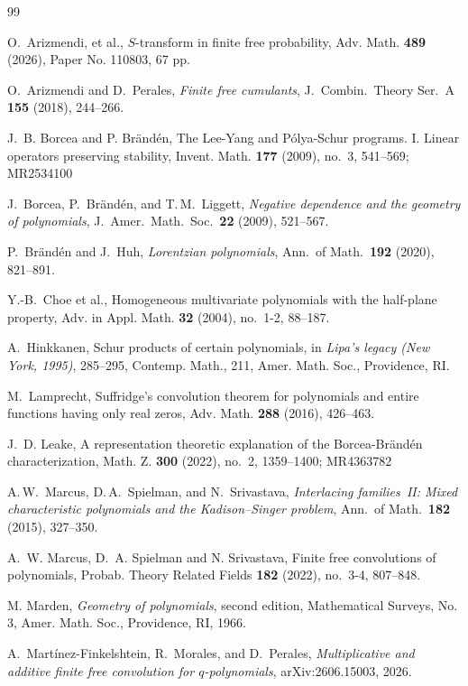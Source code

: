 \documentclass[11pt]{amsart}
\theoremstyle{definition}
\begin{document}
\begin{thebibliography}{99}

 O.~Arizmendi, et al., $S$-transform in finite free probability, Adv. Math. {\bf 489} (2026), Paper No. 110803, 67 pp.

O.~Arizmendi and D.~Perales,
\emph{Finite free cumulants},
J.~Combin.\ Theory Ser.~A \textbf{155} (2018), 244--266.

 J.~B. Borcea and P. Br\"and\'en, The Lee-Yang and P\'olya-Schur programs. I. Linear operators preserving stability, Invent. Math. {\bf 177} (2009), no.~3, 541--569; MR2534100

J.~Borcea, P.~Br\"and\'en, and T.\,M.~Liggett,
\emph{Negative dependence and the geometry of polynomials},
J.~Amer.\ Math.\ Soc.\ \textbf{22} (2009), 521--567.

P.~Br\"and\'en and J.~Huh,
\emph{Lorentzian polynomials},
Ann.\ of Math.\ \textbf{192} (2020), 821--891.

 Y.-B.~Choe et al., Homogeneous multivariate polynomials with the half-plane property, Adv. in Appl. Math. {\bf 32} (2004), no.~1-2, 88--187.

 A.~Hinkkanen, Schur products of certain polynomials, in {\it Lipa's legacy (New York, 1995)}, 285--295, Contemp. Math., 211, Amer. Math. Soc., Providence, RI.

M.~Lamprecht, Suffridge's convolution theorem for polynomials and entire functions having only real zeros, Adv. Math. {\bf 288} (2016), 426--463.

J.~D. Leake, A representation theoretic explanation of the Borcea-Br\"and\'en characterization, Math. Z. {\bf 300} (2022), no.~2, 1359--1400; MR4363782

A.\,W.~Marcus, D.\,A.~Spielman, and N.~Srivastava,
\emph{Interlacing families~II: Mixed characteristic polynomials
and the Kadison--Singer problem},
Ann.\ of Math.\ \textbf{182} (2015), 327--350.

 A.~W. Marcus, D.~A. Spielman and N. Srivastava, Finite free convolutions of polynomials, Probab. Theory Related Fields {\bf 182} (2022), no.~3-4, 807--848.

M. Marden, {\it Geometry of polynomials}, second edition, 
Mathematical Surveys, No. 3, Amer. Math. Soc., Providence, RI, 1966.

A.~Mart\'inez-Finkelshtein, R.~Morales, and D.~Perales,
\emph{Multiplicative and additive finite free convolution for \(q\)-polynomials},
arXiv:2606.15003, 2026.


\end{thebibliography}
\end{document}
